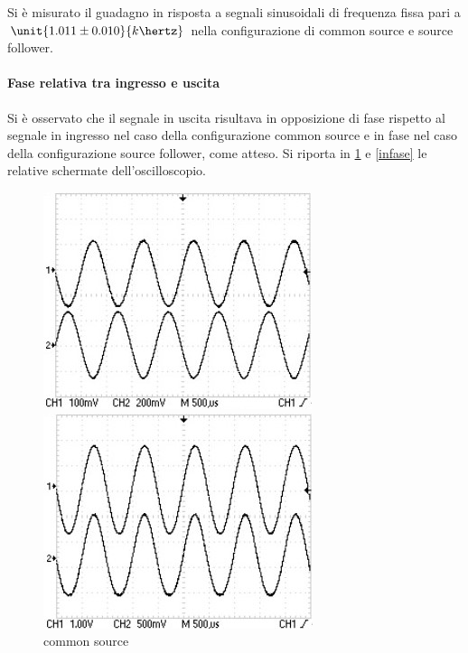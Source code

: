 \documentclass[10pt,a4paper]{article}
\begin{document}
Si è misurato il guadagno in risposta a segnali sinusoidali di frequenza fissa pari a $\unit{1.011 \pm 0.010}{k\hertz}$ nella configurazione di common source e source follower.

\paragraph{Fase relativa tra ingresso e uscita} Si è osservato che il segnale in uscita risultava in opposizione di fase rispetto al segnale in ingresso nel caso della configurazione common source e in fase nel caso della configurazione source follower, come atteso. Si riporta in \figurename{\ref{fig:controfase}} e \figurename{\ref{infase}} le relative schermate dell'oscilloscopio.

\begin{figure}[h!]
	\centering
	\begin{minipage}[h!]{0.45\textwidth}
		\centering
		\includegraphics[width=\textwidth]{../oscilloscopio/inversione_fase.jpg}
		\caption{common source}
			\label{fig:controfase}
	\end{minipage}
	\begin{minipage}[h!]{0.45\textwidth}
		\centering
		\includegraphics[width=\textwidth]{../oscilloscopio/fase.jpg}

\end{minipage}
\end{figure}
\end{document}
